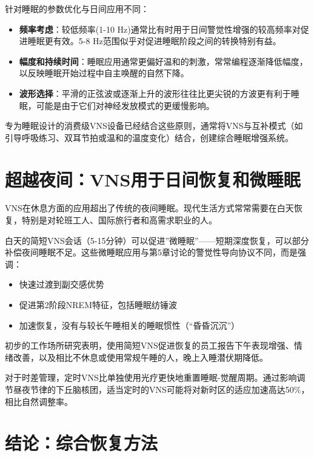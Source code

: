 \documentclass[
  Letterpaper,
]{scrbook}
\providecommand{\tightlist}{%
  \setlength{\itemsep}{0pt}\setlength{\parskip}{0pt}}\usepackage{longtable,booktabs,array}
\begin{document}
针对睡眠的参数优化与日间应用不同：

\begin{itemize}
\item
  \textbf{频率考虑}：较低频率(1-10
  Hz)通常比有时用于日间警觉性增强的较高频率对促进睡眠更有效。5-8
  Hz范围似乎对促进睡眠阶段之间的转换特别有益。
\item
  \textbf{幅度和持续时间}：睡眠应用通常更偏好温和的刺激，常常编程逐渐降低幅度，以反映睡眠开始过程中自主唤醒的自然下降。
\item
  \textbf{波形选择}：平滑的正弦波或逐渐上升的波形往往比更尖锐的方波更有利于睡眠，可能是由于它们对神经发放模式的更缓慢影响。
\end{itemize}

专为睡眠设计的消费级VNS设备已经结合这些原则，通常将VNS与互补模式（如引导呼吸练习、双耳节拍或温和的温度变化）结合，创建综合睡眠增强系统。

\section{超越夜间：VNS用于日间恢复和微睡眠}\label{ux8d85ux8d8aux591cux95f4vnsux7528ux4e8eux65e5ux95f4ux6062ux590dux548cux5faeux7761ux7720}

VNS在休息方面的应用超出了传统的夜间睡眠。现代生活方式常常需要在白天恢复，特别是对轮班工人、国际旅行者和高需求职业的人。

白天的简短VNS会话（5-15分钟）可以促进''微睡眠''------短期深度恢复，可以部分补偿夜间睡眠不足。这些微睡眠应用与第5章讨论的警觉性导向协议不同，而是强调：

\begin{itemize}
\tightlist
\item
  快速过渡到副交感优势
\item
  促进第2阶段NREM特征，包括睡眠纺锤波
\item
  加速恢复，没有与较长午睡相关的睡眠惯性（``昏昏沉沉''）
\end{itemize}

初步的工作场所研究表明，使用简短VNS促进恢复的员工报告下午表现增强、情绪改善，以及相比不休息或使用常规午睡的人，晚上入睡潜伏期降低。

对于时差管理，定时VNS比单独使用光疗更快地重置睡眠-觉醒周期。通过影响调节昼夜节律的下丘脑核团，适当定时的VNS可能将对新时区的适应加速高达50\%，相比自然调整率。

\section{结论：综合恢复方法}\label{ux7ed3ux8bbaux7efcux5408ux6062ux590dux65b9ux6cd5}
\end{document}

